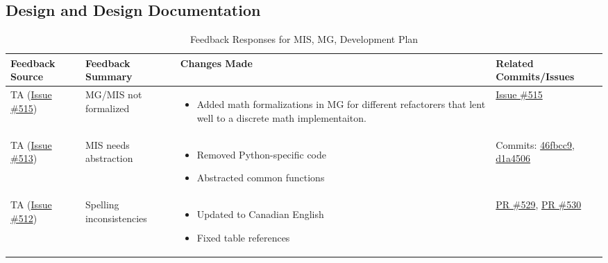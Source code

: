 \documentclass{article}
\begin{document}
\subsection{Design and Design Documentation}

\begin{table}[h]
    \centering
    \caption{Feedback Responses for MIS, MG, Development Plan}
    \label{tab:feedback}
    \begin{tabularx}{\textwidth}{|l|X|X|X|}
    \hline
    \textbf{Feedback Source} & \textbf{Feedback Summary} & \textbf{Changes Made} & \textbf{Related Commits/Issues} \\
    \hline
    \hline
    TA (\href{https://github.com/ssm-lab/capstone--source-code-optimizer/issues/515}{Issue \#515}) & 
    MG/MIS not formalized &
    \begin{itemize}
        \item Added math formalizations in MG for different refactorers that lent well to a discrete math implementaiton. 
    \end{itemize} &
    \href{https://github.com/ssm-lab/capstone--source-code-optimizer/issues/515}{Issue \#515} \\
    \hline
    
    TA (\href{https://github.com/ssm-lab/capstone--source-code-optimizer/issues/513}{Issue \#513}) & 
    MIS needs abstraction &
    \begin{itemize}
        \item Removed Python-specific code
        \item Abstracted common functions
    \end{itemize} &
    Commits: 
    \href{https://github.com/ssm-lab/capstone--source-code-optimizer/commit/46fbcc9}{46fbcc9},
    \href{https://github.com/ssm-lab/capstone--source-code-optimizer/commit/d1a4506}{d1a4506} \\
    \hline
    
    TA (\href{https://github.com/ssm-lab/capstone--source-code-optimizer/issues/512}{Issue \#512}) & 
    Spelling inconsistencies &
    \begin{itemize}
        \item Updated to Canadian English
        \item Fixed table references
    \end{itemize} &
    \href{https://github.com/ssm-lab/capstone--source-code-optimizer/issues/529}{PR \#529},
    \href{https://github.com/ssm-lab/capstone--source-code-optimizer/issues/530}{PR \#530} \\
    \hline
    

\end{tabularx}
\end{table}
\end{document}
